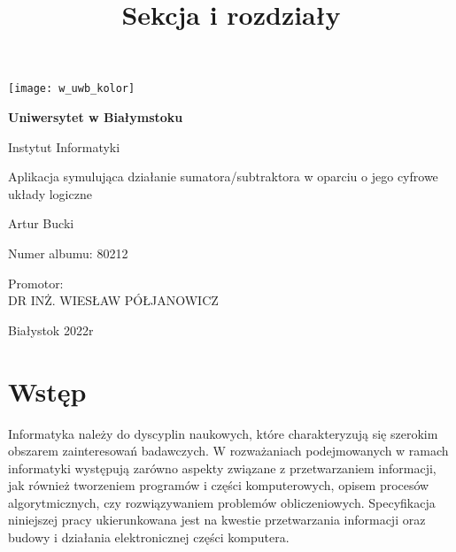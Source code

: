 \documentclass[12pt, a4paper, onside, polish]{article}				%
\title{Sekcja i rozdziały}						%
\begin{document}
\begin{titlepage}
	\begin{center}
	
		\texttt{[image: w\_uwb\_kolor]}
		
		\vspace{2cm}

	
		\Huge
        		\textbf{Uniwersytet w Białymstoku}
        		
        		\vspace{0.5cm}
        		\LARGE
        		Instytut Informatyki
        		
        		\vspace{1cm}
        		\LARGE
        		Aplikacja symulująca działanie sumatora/subtraktora w oparciu o jego cyfrowe układy logiczne 
        		
        		\vspace{1.5cm}
        		\large
        		Artur Bucki
        		
        		\large
        		Numer albumu: 80212
        		
        		\vspace{0.5cm}
        		
		\begin{flushright}
		Promotor:\\
		DR INŻ. WIESŁAW PÓŁJANOWICZ\\
		\end{flushright}


		\vspace*{\fill}
		\large
		Białystok 2022r
        		
	\end{center}
\end{titlepage}





\tableofcontents
\cleardoublepage


\section{Wstęp}
\hspace{\parindent}
Informatyka należy do dyscyplin naukowych, które charakteryzują się szerokim obszarem zainteresowań badawczych. W rozważaniach podejmowanych w ramach informatyki występują zarówno aspekty związane z przetwarzaniem informacji, jak również tworzeniem programów i części komputerowych, opisem procesów algorytmicznych, czy rozwiązywaniem problemów obliczeniowych. Specyfikacja niniejszej pracy ukierunkowana jest na kwestie przetwarzania informacji oraz budowy i działania elektronicznej części komputera.
\end{document}
